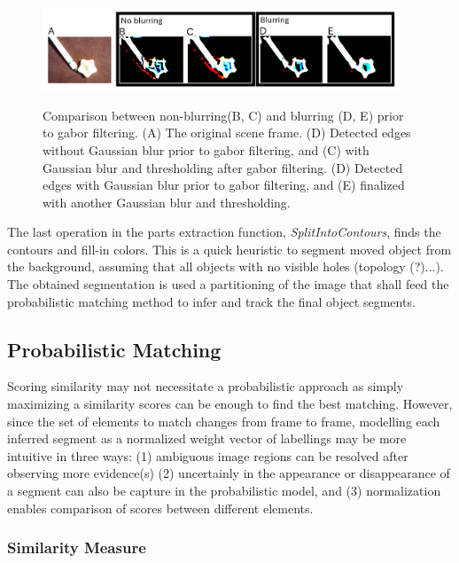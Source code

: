\documentclass{article}
\begin{document}
\begin{figure}[tbp]
\begin{center}
\caption{Comparison between non-blurring(B, C) and blurring (D, E) prior to gabor filtering. (A) The original scene frame.  (D) Detected edges without Gaussian blur prior to gabor filtering, and (C) with Gaussian blur and thresholding after gabor filtering. (D) Detected edges with Gaussian blur prior to gabor filtering, and (E) finalized with another Gaussian blur and thresholding.}
  \includegraphics[width=0.95\textwidth]{2}
\label{figure:gaussian_blur}
\end{center}
\end{figure}


The last operation in the parts extraction function, \emph{SplitIntoContours}, finds the contours and fill-in colors. This is a quick heuristic to segment moved object from the background, assuming that all objects with no visible holes (topology (?)...). The obtained segmentation is used a partitioning of the image that shall feed the probabilistic matching method to infer and track the final object segments. 

\subsection{Probabilistic Matching}

Scoring similarity may not necessitate a probabilistic approach as simply maximizing a similarity scores can be enough to find the best matching. However, since the set of elements to match changes from frame to frame, modelling each inferred segment as a normalized weight vector of labellings may be more intuitive in three ways: (1) ambiguous image regions can be resolved after observing more evidence(s) (2) uncertainly in the appearance or disappearance of a segment can also be capture in the probabilistic model, and (3) normalization enables comparison of scores between different elements. 

\subsubsection{Similarity Measure}
\end{document}
